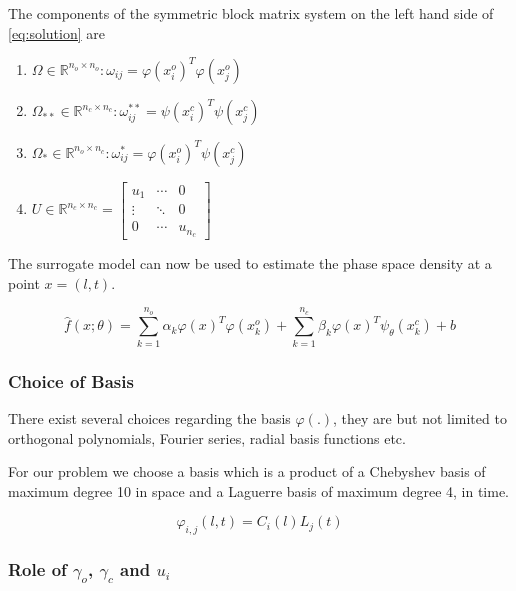 The components of the symmetric block matrix system on the left hand side of 
\cref{eq:solution} are 
\begin{enumerate}
\item $\Omega \in \mathbb{R}^{n_{o} \times n_{o}}: \omega_{ij} = \varphi(x^{o}_{i})^{T} \varphi(x^{o}_{j})$
\item $\Omega_{**} \in \mathbb{R}^{n_{c} \times n_{c}}: \omega^{**}_{ij} = \psi(x^{c}_{i})^{T} \psi(x^{c}_{j})$
\item $\Omega_{*} \in \mathbb{R}^{n_{o} \times n_{c}}: \omega^{*}_{ij} = \varphi(x^{o}_{i})^{T} \psi(x^{c}_{j})$
\item $U \in \mathbb{R}^{n_{c} \times n_{c}} = \begin{bmatrix}
    u_1 & \cdots & 0 \\ 
    \vdots & \ddots  & 0\\ 
    0 & \cdots  & u_{n_{c}} 
  \end{bmatrix}$
\end{enumerate}

The surrogate model can now be used to estimate the phase space density 
at a point $x = (l,t)$.

\begin{equation}\label{eq:model}
\hat{f}(x;\theta) = \sum_{k = 1}^{n_{o}}{\alpha_{k}\varphi(x)^{T}\varphi(x^{o}_{k}) + \sum_{k = 1}^{n_{c}}}{\beta_{k} \varphi(x)^{T} \psi_{\theta}(x^{c}_{k})} + b
\end{equation}

\subsubsection*{Choice of Basis}

There exist several choices regarding the basis $\varphi(.)$, they are but not limited to 
orthogonal polynomials, Fourier series, radial basis functions etc. 

For our problem we choose a basis which is a product of a Chebyshev basis of maximum degree 10 in space and a Laguerre basis of maximum degree 4, in time.

\begin{equation}\label{eq:basis}
\varphi_{i,j}(l,t) = C_{i}(l) L_{j}(t)
\end{equation}



\subsubsection*{Role of $\gamma_o$, $\gamma_c$ and $u_i$}

